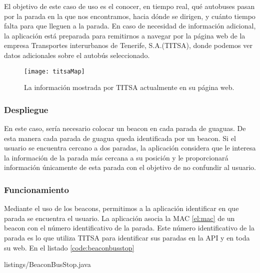 El objetivo de este caso de uso es el conocer, en tiempo real, qué autobuses pasan por la parada en la que nos encontramos, hacia dónde se dirigen, y cuánto tiempo falta para que lleguen a la parada. En caso de necesidad de información adicional, la aplicación está preparada para remitirnos a navegar por la página web \cite{URL::titsa} de la empresa Transportes interurbanos de Tenerife, S.A.(TITSA), donde podemos ver datos adicionales sobre el autobús seleccionado.

\begin{figure}[H]
	\centering
	\texttt{[image: titsaMap]}
	\caption{La información mostrada por TITSA actualmente en su página web.}
	\label{fig:MapaTitsa}
\end{figure}

\subsubsection{Despliegue}

En este caso, sería necesario colocar un beacon en cada parada de guaguas. De esta manera cada parada de guagua queda identificada por un beacon. Si el usuario se encuentra cercano a dos paradas, la aplicación considera que le interesa la información de la parada más cercana a su posición y le proporcionará información únicamente de esta parada con el objetivo de no confundir al usuario.

\subsubsection{Funcionamiento}


Mediante el uso de los beacons, permitimos a la aplicación identificar en que parada se encuentra el usuario. La aplicación asocia la MAC \ref{el:mac} de un beacon con el número identificativo de la parada. Este número identificativo de la parada es lo que utiliza TITSA para identificar sus paradas en la API y en toda su web. En el listado \ref{code:beaconbusstop}

\vspace{5mm}


{listings/BeaconBusStop.java} %

\vspace{5mm}

